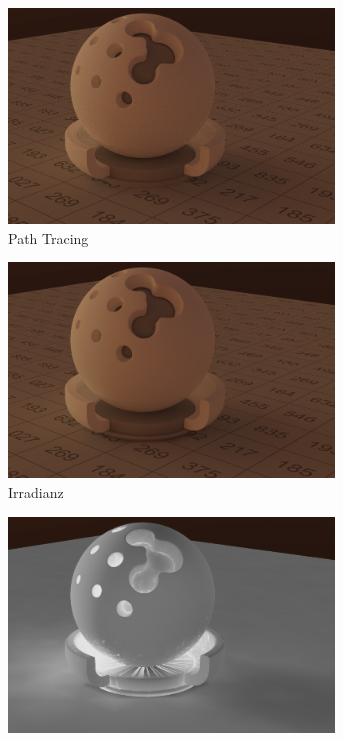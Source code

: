 	\begin{figure}[h]
		\begin{subfigure}[t]{0.33\textwidth}
			\center
			\includegraphics[width=0.95\textwidth]{pic/irr_est-ra-shaderball-ref.png}
			\caption{Path Tracing}
		\end{subfigure}
		\begin{subfigure}[t]{0.33\textwidth}
			\center
			\includegraphics[width=0.95\textwidth]{pic/irr_est-ra-shaderball-irr.png}
			\caption{Irradianz}
		\end{subfigure}
		\begin{subfigure}[t]{0.33\textwidth}
			\center
			\includegraphics[width=0.95\textwidth]{pic/irr_est-ra-shaderball-scount.png}

\end{subfigure}
\end{figure}
